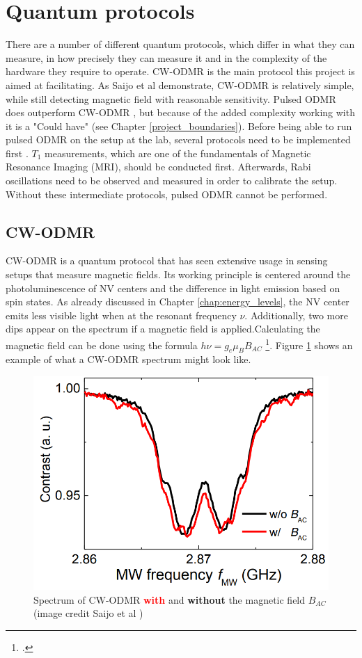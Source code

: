 \section{Quantum protocols}
There are a number of different quantum protocols, which differ in what they can measure, in how precisely they can measure it and in the complexity of the hardware they require to operate. CW-ODMR is the main protocol this project is aimed at facilitating. As Saijo et al \cite{saijo2018ac} demonstrate, CW-ODMR is relatively simple, while still detecting magnetic field with reasonable sensitivity. Pulsed ODMR does outperform CW-ODMR \cite{zhang2020high}, but because of the added complexity working with it is a "Could have" (see Chapter \ref{project_boundaries}). Before being able to run pulsed ODMR on the setup at the lab, several protocols need to be implemented first \cite{sewani2020coherent}. $T_1$ measurements, which are one of the fundamentals of Magnetic Resonance Imaging (MRI), should be conducted first. Afterwards, Rabi oscillations need to be observed and measured in order to calibrate the setup. Without these intermediate protocols, pulsed ODMR cannot be performed.



\subsection{CW-ODMR}
CW-ODMR is a quantum protocol that has seen extensive usage in sensing setups that measure magnetic fields. Its working principle is centered around the photoluminescence of NV centers and the difference in light emission based on spin states. As already discussed in Chapter \ref{chap:energy_levels}, the NV center emits less visible light when at the resonant frequency $\nu$. Additionally, two more dips appear on the spectrum if a magnetic field is applied.Calculating the magnetic field can be done using the formula $h\nu = g_e\mu_BB_{AC}$ \footcite[In the formula, $h$ is the Planck constant, $g_e$ is the g-factor of the electron and $\mu_B$ is the Bohr magnetron. Knowing all other variables, $B_{AC}$ can easily be calculated.]{enwiki:1301371272}. Figure \ref{fig:cwodmr} shows an example of what a CW-ODMR spectrum might look like. 

\begin{figure}[ht]
	\centering
	\includegraphics[width=0.7\linewidth]{img/cw_odmr}
	\caption{Spectrum of CW-ODMR \textbf{\textcolor{red}{with}} and \textbf{without} the magnetic field $B_{AC}$ (image credit Saijo et al \cite{saijo2018ac})}
	\label{fig:cwodmr}
\end{figure}


